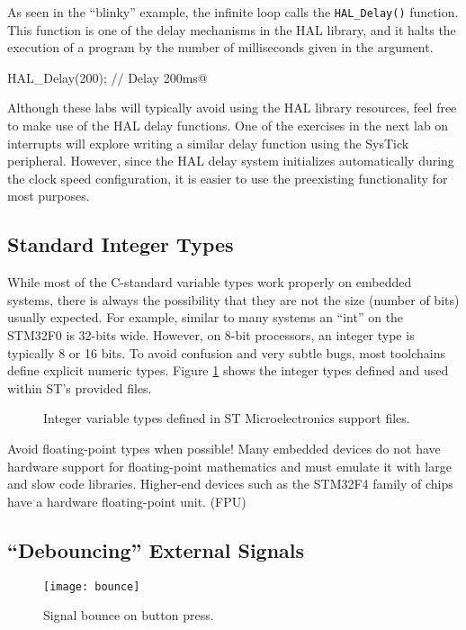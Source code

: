 \documentclass[openany,11pt,fleqn]{book} %
\makeatletter
\newcommand{\ilcode}[1]{
    \begin{center} \parskip=-15pt \colorbox{gray!20!white}{
        \parbox{\columnwidth-2\fboxsep}{
            \lstinline@#1@
        }
    } \end{center}
}
\newcommand{\code}[3]{
    \begin{figure}[]
        \begin{center}
            \hspace*{-3.4cm}
            \colorbox{gray!20!white}{
                \parbox{0.8\paperwidth} {
                    
                }
            }
            \caption{#2}
            \label{#3}
        \end{center}
    \end{figure}
}
\makeatother
\begin{document}
As seen in the ``blinky'' example, the infinite loop calls the \texttt{HAL\_Delay()} function. This function is one of the delay mechanisms in the HAL library, and it halts the execution of a program by the number of milliseconds given in the argument. 

\ilcode{HAL_Delay(200); // Delay 200ms}

Although these labs will typically avoid using the HAL library resources, feel free to make use of the HAL delay functions. One of the exercises in the next lab on interrupts will explore writing a similar delay function using the SysTick peripheral. However, since the HAL delay system initializes automatically during the clock speed configuration, it is easier to use the preexisting functionality for most purposes. 
%
\subsection{\color{orange}Standard Integer Types}
%
While most of the C-standard variable types work properly on embedded systems, there is always the possibility that they are not the size (number of bits) usually expected. For example, similar to many systems an ``int'' on the STM32F0 is 32-bits wide. However, on 8-bit processors, an integer type is typically 8 or 16 bits. To avoid confusion and very subtle bugs, most toolchains define explicit numeric types. Figure \ref{types} shows the integer types defined and used within ST's provided files.
%
\code{./files/types.h}{Integer variable types defined in ST Microelectronics support files.}{types}
\begin{warning}
    Avoid floating-point types when possible! Many embedded devices do not have hardware support for floating-point mathematics and must emulate it with large and slow code libraries. Higher-end devices such as the STM32F4 family of chips have a hardware floating-point unit. (FPU) 
\end{warning}

\subsection{``Debouncing'' External Signals} \label{bounce_section}

\begin{figure}[]
    \centering\texttt{[image: bounce]}
    \caption{Signal bounce on button press.}
    \label{bounce}
\end{figure}
\end{document}
